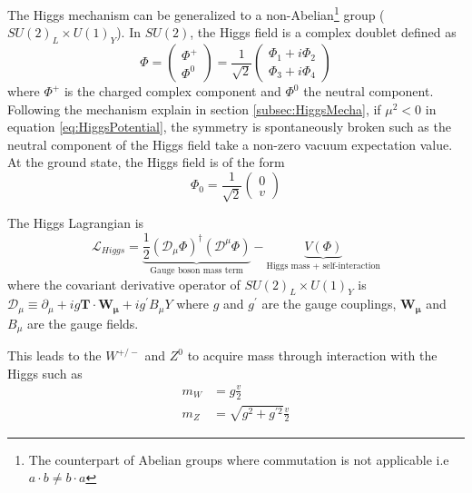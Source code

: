 The Higgs mechanism can be generalized to a non-Abelian\footnote{The counterpart of Abelian groups where commutation is not applicable i.e $a \cdot b \neq b \cdot a$} group ($SU(2)_{L} \times U(1)_{Y}$). In $SU(2)$, the Higgs field is a complex doublet defined as
\begin{equation}
\Phi = \begin{pmatrix} \Phi^+ \\ \Phi^0 \end{pmatrix}= \frac{1}{\sqrt{2}} \begin{pmatrix} \Phi_1+i\Phi_2 \\ \Phi_3+i\Phi_4 \end{pmatrix}
\end{equation}
where $\Phi^+$ is the charged complex component and $\Phi^0$ the neutral component. Following the mechanism explain in section \ref{subsec:HiggsMecha}, if $\mu^2 < 0$ in equation \ref{eq:HiggsPotential}, the symmetry is spontaneously broken such as the neutral component of the Higgs field take a non-zero vacuum expectation value. At the ground state, the Higgs field is of the form
\begin{equation}
\Phi_0 = \frac{1}{\sqrt{2}}\begin{pmatrix} 0 \\ v \end{pmatrix}
\end{equation}

The Higgs Lagrangian is
\begin{equation}
  \mathcal{L}_{Higgs} = \underbrace{\frac{1}{2}(\mathcal{D}_{\mu}\Phi)^{\dagger}(\mathcal{D}^{\mu}\Phi)}_{\text{Gauge boson mass term}} - \underbrace{V(\Phi)}_{\text{Higgs mass + self-interaction}}
\end{equation}
where the covariant derivative operator of $SU(2)_{L} \times U(1)_{Y}$ is $\mathcal{D}_{\mu} \equiv \partial_{\mu} + ig\mathbf{T} \cdot \mathbf{W_{\mu}} + ig^{\prime} B_{\mu}Y$ where $g$ and $g^{\prime}$ are the gauge couplings, $\mathbf{W_{\mu}}$ and $B_{\mu}$ are the gauge fields.

This leads to the $W^{+/-}$ and $Z^0$ to acquire mass through interaction with the Higgs such as
\begin{equation}
  \begin{aligned}
    m_{W} &= g\frac{v}{2}\\
    m_{Z} &= \sqrt{g^2 + g^{\prime 2}}\frac{v}{2}
  \end{aligned}
\end{equation}

